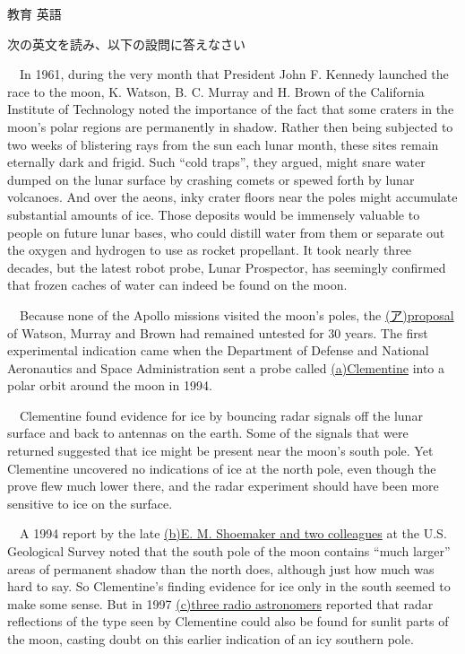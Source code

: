 \documentclass[fleqn]{jbook}
\begin{document}
\begin{question}{教育 英語}{}

\begin{subquestions}
\SubQuestion
次の英文を読み、以下の設問に答えなさい
\baselineskip=12pt

　In 1961, during the very month that President John F. Kennedy launched the race to the moon, K. Watson, B. C. Murray and H. Brown of the California Institute of Technology noted the importance of the fact that some craters in the moon's polar regions are permanently in shadow. Rather then being subjected to two weeks of blistering rays from the sun each lunar month, these sites remain eternally dark and frigid. Such ``cold traps'', they argued, might snare water dumped on the lunar surface by crashing comets or spewed forth by lunar volcanoes. And over the aeons, inky crater floors near the poles might accumulate substantial amounts of ice. Those deposits would be immensely valuable to people on future lunar bases, who could distill water from them or separate out the oxygen and hydrogen to use as rocket propellant. It took nearly three decades, but the latest robot probe, Lunar Prospector, has seemingly confirmed that frozen caches of water can indeed be found on the moon.

　Because none of the Apollo missions visited the moon's poles, the \underline{(ア)proposal} of Watson, Murray and Brown had remained untested for 30 years. The first experimental indication came when the Department of Defense and National Aeronautics and Space Administration sent a probe called \underline{(a)Clementine} into a polar orbit around the moon in 1994.

　Clementine found evidence for ice by bouncing radar signals off the lunar surface and back to antennas on the earth. Some of the signals that were returned suggested that ice might be present near the moon's south pole. Yet Clementine uncovered no indications of ice at the north pole, even though the prove flew much lower there, and the radar experiment should have been more sensitive to ice on the surface.

　A 1994 report by the late \underline{(b)E. M. Shoemaker and two
 colleagues} at the U.S. Geological Survey noted that the south
 pole of the moon contains ``much larger'' areas of permanent shadow
 than the north does, although just how much was hard to say. So
 Clementine's finding evidence for ice only in the south seemed to
 make some sense. But in 1997 \underline{(c)three radio
 astronomers} reported that radar reflections of the type seen by
 Clementine could also be found for sunlit parts of the moon,
 casting doubt on this earlier indication of an icy southern
 pole. 


\end{subquestions}
\end{question}
\end{document}
